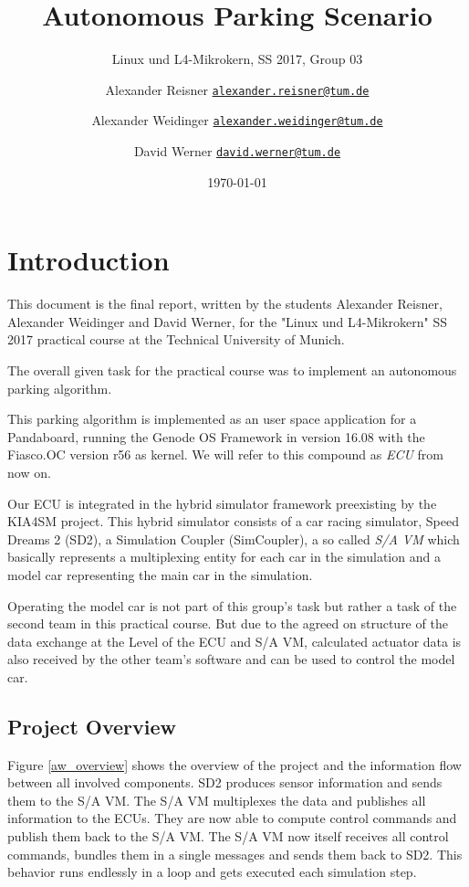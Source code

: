 \documentclass[paper=a4, fontsize=11pt]{scrreprt}
\title{Autonomous Parking Scenario}
\subtitle{Linux und L4-Mikrokern, SS 2017, Group 03}
\author{Alexander Reisner \href{mailto:alexander.reisner@tum.de}{\texttt{alexander.reisner@tum.de}} \and
Alexander Weidinger \href{mailto:alexander.weidinger@tum.de}{\texttt{alexander.weidinger@tum.de}} \and
David Werner \href{mailto:david.werner@tum.de}{\texttt{david.werner@tum.de}}}
\date{\today}
\begin{document}
\maketitle
\newpage

\tableofcontents
\newpage

\chapter{Introduction}
This document is the final report, written by the students Alexander Reisner,
Alexander Weidinger and David Werner, for the "Linux und L4-Mikrokern" SS 2017 practical course at the Technical University of Munich.

The overall given task for the practical course was to implement an autonomous parking algorithm.

This parking algorithm is implemented as an user space application for a Pandaboard,
running the Genode OS Framework in version 16.08 with the Fiasco.OC version r56 as kernel.
We will refer to this compound as \textit{ECU} from now on.

Our ECU is integrated in the hybrid simulator framework preexisting by the KIA4SM project.
This hybrid simulator consists of a car racing simulator, Speed Dreams 2 (SD2),
a Simulation Coupler (SimCoupler), a so called \textit{S/A VM} which basically represents a multiplexing entity for each car in the simulation
and a model car representing the main car in the simulation.

Operating the model car is not part of this group's task but rather a task of the second team in this practical course.
But due to the agreed on structure of the data exchange at the Level of the ECU and S/A VM,
calculated actuator data is also received by the other team's software and can be used to control the model car.

\section{Project Overview}
Figure \ref{aw_overview} shows the overview of the project and the information flow between all involved components.
SD2 produces sensor information and sends them to the S/A VM.
The S/A VM multiplexes the data and publishes all information to the ECUs.
They are now able to compute control commands and publish them back to the S/A VM.
The S/A VM now itself receives all control commands, bundles them in a single messages
and sends them back to SD2.
This behavior runs endlessly in a loop and gets executed each simulation step.
\end{document}

